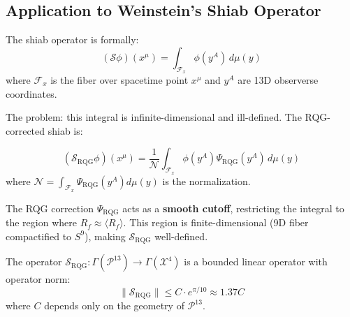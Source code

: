 \subsection{Application to Weinstein's Shiab Operator}

The shiab operator is formally:
\begin{equation}
(\mathcal{S} \phi)(x^\mu) = \int_{\mathcal{F}_x} \phi(y^A) \, d\mu(y)
\end{equation}
where $\mathcal{F}_x$ is the fiber over spacetime point $x^\mu$ and $y^A$ are 13D observerse coordinates.

The problem: this integral is infinite-dimensional and ill-defined. The RQG-corrected shiab is:

\begin{definition}
\label{def:rqg_shiab}
\begin{equation}
(\mathcal{S}_{\text{RQG}} \phi)(x^\mu) = \frac{1}{\mathcal{N}} \int_{\mathcal{F}_x} \phi(y^A) \Psi_{\text{RQG}}(y^A) \, d\mu(y)
\end{equation}
where $\mathcal{N} = \int_{\mathcal{F}_x} \Psi_{\text{RQG}}(y^A) d\mu(y)$ is the normalization.
\end{definition}

The RQG correction $\Psi_{\text{RQG}}$ acts as a \textbf{smooth cutoff}, restricting the integral to the region where $R_f \approx \langle R_f \rangle$. This region is finite-dimensional (9D fiber compactified to $S^9$), making $\mathcal{S}_{\text{RQG}}$ well-defined.

\begin{theorem}
\label{thm:rqg_shiab_welldefined}
The operator $\mathcal{S}_{\text{RQG}}: \Gamma(\mathcal{P}^{13}) \to \Gamma(\mathcal{X}^4)$ is a bounded linear operator with operator norm:
\begin{equation}
\|\mathcal{S}_{\text{RQG}}\| \leq C \cdot e^{\pi/10} \approx 1.37 C
\end{equation}
where $C$ depends only on the geometry of $\mathcal{P}^{13}$.
\end{theorem}


